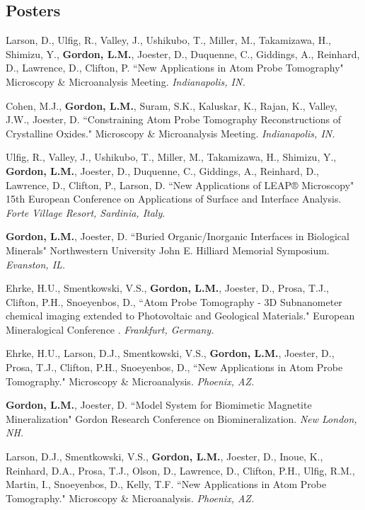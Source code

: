 \subsection*{Posters}
Larson, D., Ulfig, R., Valley, J., Ushikubo, T., Miller, M., Takamizawa, H., Shimizu, Y., \textbf{Gordon, L.M.}, Joester, D., Duquenne, C., Giddings, A., Reinhard, D., Lawrence, D., Clifton, P. ``New Applications in Atom Probe Tomography" Microscopy \& Microanalysis Meeting. \emph{Indianapolis, IN.}

Cohen, M.J., \textbf{Gordon, L.M.}, Suram, S.K., Kaluskar, K., Rajan, K., Valley, J.W., Joester, D. ``Constraining Atom Probe Tomography Reconstructions of Crystalline Oxides." Microscopy \& Microanalysis Meeting. \emph{Indianapolis, IN.}

Ulfig, R., Valley, J., Ushikubo, T., Miller, M., Takamizawa, H., Shimizu, Y., \textbf{Gordon, L.M.}, Joester, D., Duquenne, C., Giddings, A., Reinhard, D., Lawrence, D., Clifton, P., Larson, D. ``New Applications of LEAP® Microscopy" 15th European Conference on Applications of Surface and Interface Analysis. \emph{Forte Village Resort, Sardinia, Italy}.

\textbf{Gordon, L.M.}, Joester, D. ``Buried Organic/Inorganic Interfaces in Biological Minerals" Northwestern University John E. Hilliard Memorial Symposium. \emph{Evanston, IL.}

Ehrke, H.U., Smentkowski, V.S., \textbf{Gordon, L.M.}, Joester, D., Prosa, T.J., Clifton, P.H., Snoeyenbos, D., ``Atom Probe Tomography - 3D Subnanometer chemical imaging extended to Photovoltaic and Geological Materials." European Mineralogical Conference . \emph{Frankfurt, Germany.}

Ehrke, H.U., Larson, D.J., Smentkowski, V.S., \textbf{Gordon, L.M.}, Joester, D., Prosa, T.J., Clifton, P.H., Snoeyenbos, D., ``New Applications in Atom Probe Tomography." Microscopy \& Microanalysis. \emph{Phoenix, AZ.}

\textbf{Gordon, L.M.}, Joester, D. ``Model System for Biomimetic Magnetite Mineralization" Gordon Research Conference on Biomineralization. \emph{New London, NH.}

Larson, D.J., Smentkowski, V.S., \textbf{Gordon, L.M.}, Joester, D., Inoue, K.,  Reinhard, D.A., Prosa, T.J., Olson, D., Lawrence, D., Clifton, P.H., Ulfig, R.M., Martin, I., Snoeyenbos, D., Kelly, T.F. ``New Applications in Atom Probe Tomography." Microscopy \& Microanalysis. \emph{Phoenix, AZ.}

